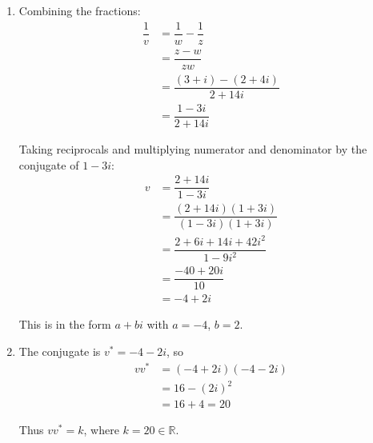 \documentclass[leqno]{article}
\begin{document}
\begin{enumerate}[
  label=\textbf{\arabic*.},
  leftmargin=*,
  topsep=0pt,
  partopsep=0pt,
  parsep=0pt
]
\begin{djsSolution}
\begin{enumerate}[label=\textbf{(\alph*)}, start=1]
\begin{enumerate}[label=(\roman*), start=1]
Hence the modulus is
\[
|zw|=\sqrt{2^2+14^2}=\sqrt{200}=10\sqrt{2}
\]

\(zw\) lies in the first quadrant, as its real and imaginary parts are both positive, so its principal argument is
\[
\arg(zw)=\arctan\left(\dfrac{14}{2}\right)=\arctan 7\approx 1.43\text{ radians}
\]

\item Using part (a)(i), \(r=10\sqrt{2}\) and \(\theta=\arctan 7\), which lies in the required interval:
\[
zw=10\sqrt{2}\left(\cos(\arctan 7)+i\sin(\arctan 7)\right)
\]

\end{enumerate}
\item Combining the fractions:
\begin{align*}
\dfrac{1}{v}&=\dfrac{1}{w}-\dfrac{1}{z}\\
&=\dfrac{z-w}{zw}\\
&=\dfrac{(3+i)-(2+4i)}{2+14i}\\
&=\dfrac{1-3i}{2+14i}
\end{align*}

Taking reciprocals and multiplying numerator and denominator by the conjugate of \(1-3i\):
\begin{align*}
v&=\dfrac{2+14i}{1-3i}\\
&=\dfrac{(2+14i)(1+3i)}{(1-3i)(1+3i)}\\
&=\dfrac{2+6i+14i+42i^2}{1-9i^2}\\
&=\dfrac{-40+20i}{10}\\
&=-4+2i
\end{align*}

This is in the form \(a+bi\) with \(a=-4\), \(b=2\).
\item The conjugate is \(v^*=-4-2i\), so
\begin{align*}
vv^*&=(-4+2i)(-4-2i)\\
&=16-(2i)^2\\
&=16+4=20
\end{align*}

Thus \(vv^*=k\), where \(k=20\in\mathbb{R}\).
\end{enumerate}
\end{djsSolution}

\newpage

\questionitem


\end{enumerate}
\end{document}
